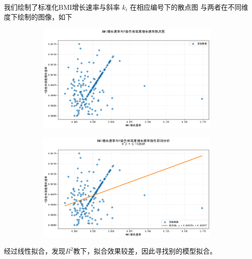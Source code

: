 \documentclass{article}
\begin{document}
我们绘制了标准化BMI增长速率与斜率 $k_i$ 在相应编号下的散点图
与两者在不同维度下绘制的图像，如下
\begin{figure}[H]
    \centering
    \begin{subfigure}[b]{0.45\textwidth}  %
        \centering
        \includegraphics[width=\textwidth]{graph/points.png}  %
        \label{fig:sub1}  %
    \end{subfigure}
    \hspace{0.05\textwidth}  %
    \begin{subfigure}[b]{0.45\textwidth}
        \centering
        \includegraphics[width=\textwidth]{graph/linear_regression.png}
        \label{fig:sub2}
    \end{subfigure}
    \label{fig:two}  %
\end{figure}

经过线性拟合，发现$R^2$教下，拟合效果较差，因此寻找别的模型拟合。
\end{document}
